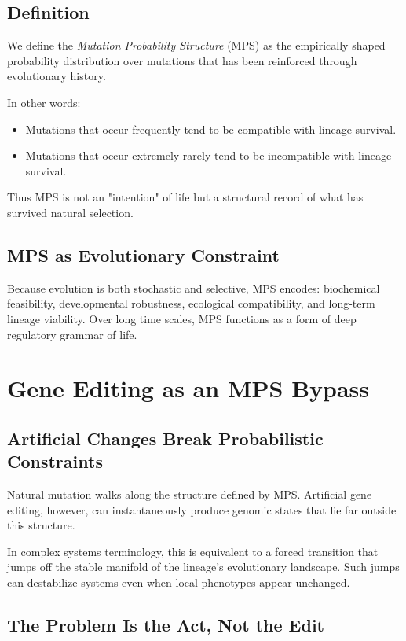 \documentclass[11pt]{article}
\begin{document}
\subsection{Definition}

We define the \textit{Mutation Probability Structure} (MPS) as the empirically shaped probability distribution over mutations that has been reinforced through evolutionary history.

In other words:
\begin{itemize}
    \item Mutations that occur frequently tend to be compatible with lineage survival.
    \item Mutations that occur extremely rarely tend to be incompatible with lineage survival.
\end{itemize}

Thus MPS is not an "intention" of life but a structural record of what has survived natural selection.

\subsection{MPS as Evolutionary Constraint}

Because evolution is both stochastic and selective, MPS encodes:
biochemical feasibility, developmental robustness, ecological compatibility, and long-term lineage viability. Over long time scales, MPS functions as a form of deep regulatory grammar of life.

\section{Gene Editing as an MPS Bypass}

\subsection{Artificial Changes Break Probabilistic Constraints}

Natural mutation walks along the structure defined by MPS. Artificial gene editing, however, can instantaneously produce genomic states that lie far outside this structure.

In complex systems terminology, this is equivalent to a forced transition that jumps off the stable manifold of the lineage's evolutionary landscape. Such jumps can destabilize systems even when local phenotypes appear unchanged.

\subsection{The Problem Is the Act, Not the Edit}
\end{document}
